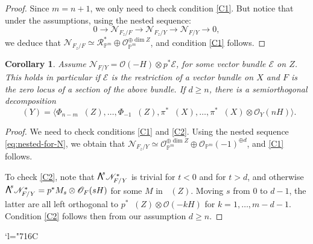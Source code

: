\documentclass[JEP,XML,SOM,Unicode,NoEqCountersInSection]{cedram}
\newcommand{\Changelback}{\mathcode`l="716C}
\newcommand\bw[1]{{\hbox{\large$\mathsf{\Lambda}$}^{\!#1}}}
\let\mathcal\mathscr
\theoremstyle{plain}
\newtheorem{cor}[theorem]{Corollary}
\theoremstyle{definition}
\newcommand{\cat}[1]{\mathsf{#1}}
\newcommand{\sod}[1]{\langle #1 \rangle}
\DeclareMathOperator{\Db}{{\cat{D}^{\mathrm{b}}}}
\newcommand{\PP}{\mathbb{P}}
\newcommand{\sheaf}[1]{\mathcal{#1}}
\newcommand{\ke}{\sheaf{E}}
\newcommand{\kn}{\sheaf{N}}
\newcommand{\ko}{\sheaf{O}}\let\OO\ko\let\cO\ko
\newcommand{\kr}{\sheaf{R}}
\begin{document}
\begin{proof}
Since $m=n+1$, we only need to check condition \eqref{C1}. But notice that under the assumptions,
using the nested sequence:
\begin{equation}\label{eq:nested-for-N}
0 \to \kn_{F_z/F} \to \kn_{F_z/Y} \to \kn_{F/Y} \to 0,
\end{equation}
we deduce that $\kn_{F_z/F} \simeq \kr^*_{\PP^m} \oplus \ko_{\PP^m}^{\oplus \dim Z}$, and
condition \eqref{C1} follows.
\end{proof}

\begin{cor}
Assume $\kn_{F/Y} = \ko(-H) \otimes p^* \ke$, for some vector bundle $\ke$ on $Z$. This
holds in particular if $\ke$ is the restriction of a vector bundle on $X$ and $F$ is the
zero locus of a section of the above bundle. If $d \geq n$, there is a semiorthogonal
decomposition
\[
\Db(Y)=\sod{\Phi_{n-m}\Db(Z),\ldots,\Phi_{-1}\Db(Z),\pi^*\Db(X),\ldots,\pi^*\Db(X)\otimes \ko_Y(nH)}.
\]
\end{cor}

\begin{proof}
We need to check conditions \eqref{C1} and \eqref{C2}.
Using the nested sequence \eqref{eq:nested-for-N}, we obtain that
$\kn_{F_z/Y} \simeq \ko_{\PP^m}^{\oplus \dim Z} \oplus \ko_{\PP^m}(-1)^{\oplus d}$, and
\eqref{C1} follows.

To check \eqref{C2}, note that $\bw{s} \kn_{F/Y}^*$ is trivial for $t<0$ and for $t>d$, and otherwise
$\bw{s} \kn_{F/Y}^*=p^*M_s \otimes \ko_F(sH)$ for some $M$ in $\Db(Z)$.
Moving $s$ from $0$ to $d-1$, the latter are all left orthogonal to $p^*\Db(Z)\otimes\ko(-kH)$ for
$k=1,\ldots,m-d-1$. Condition \eqref{C2} follows then from our assumption $d \geq n$.
\end{proof}

\Changelback
\backmatter


\end{document}
